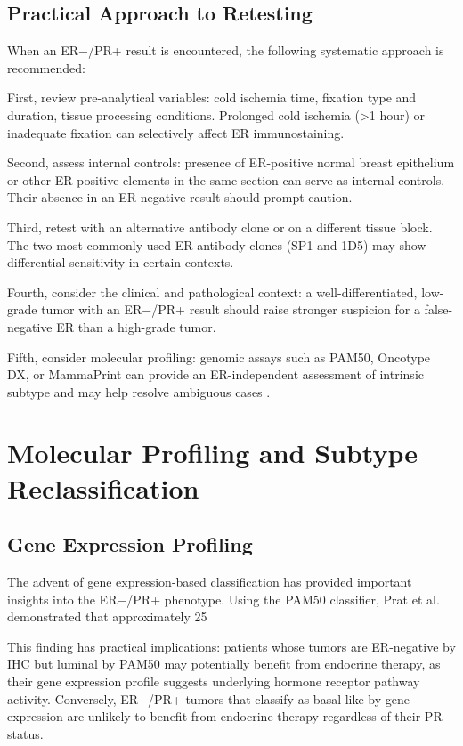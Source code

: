 \documentclass{article}
\begin{document}
\subsection{Practical Approach to Retesting}

When an ER−/PR+ result is encountered, the following systematic approach is recommended:

First, review pre-analytical variables: cold ischemia time, fixation type and duration, tissue processing conditions. Prolonged cold ischemia (>1 hour) or inadequate fixation can selectively affect ER immunostaining.

Second, assess internal controls: presence of ER-positive normal breast epithelium or other ER-positive elements in the same section can serve as internal controls. Their absence in an ER-negative result should prompt caution.

Third, retest with an alternative antibody clone or on a different tissue block. The two most commonly used ER antibody clones (SP1 and 1D5) may show differential sensitivity in certain contexts.

Fourth, consider the clinical and pathological context: a well-differentiated, low-grade tumor with an ER−/PR+ result should raise stronger suspicion for a false-negative ER than a high-grade tumor.

Fifth, consider molecular profiling: genomic assays such as PAM50, Oncotype DX, or MammaPrint can provide an ER-independent assessment of intrinsic subtype and may help resolve ambiguous cases \citep{prat2012}.

\section{Molecular Profiling and Subtype Reclassification}

\subsection{Gene Expression Profiling}

The advent of gene expression-based classification has provided important insights into the ER−/PR+ phenotype. Using the PAM50 classifier, Prat et al. \citep{prat2012} demonstrated that approximately 25%

This finding has practical implications: patients whose tumors are ER-negative by IHC but luminal by PAM50 may potentially benefit from endocrine therapy, as their gene expression profile suggests underlying hormone receptor pathway activity. Conversely, ER−/PR+ tumors that classify as basal-like by gene expression are unlikely to benefit from endocrine therapy regardless of their PR status.
\end{document}
